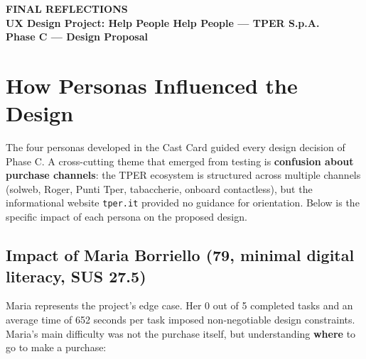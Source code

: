 ﻿
\begin{tcolorbox}[colback=primaryColor,colframe=primaryColor,arc=3mm,halign=center,valign=center,height=2.5cm]
    \color{white}\LARGE\bfseries FINAL REFLECTIONS \\[0.2cm]
    \color{white!80}\large UX Design Project: Help People Help People --- TPER S.p.A. \\[0.1cm]
    \color{white!60}\normalsize Phase C --- Design Proposal
\end{tcolorbox}

\vspace{0.5cm}

\section{How Personas Influenced the Design}

The four personas developed in the Cast Card guided every design decision of Phase C. A cross-cutting theme that emerged from testing is \textbf{confusion about purchase channels}: the TPER ecosystem is structured across multiple channels (solweb, Roger, Punti Tper, tabaccherie, onboard contactless), but the informational website \texttt{tper.it} provided no guidance for orientation. Below is the specific impact of each persona on the proposed design.

\subsection{Impact of Maria Borriello (79, minimal digital literacy, SUS 27.5)}

Maria represents the project's edge case. Her 0 out of 5 completed tasks and an average time of 652 seconds per task imposed non-negotiable design constraints. Maria's main difficulty was not the purchase itself, but understanding \textbf{where} to go to make a purchase:

